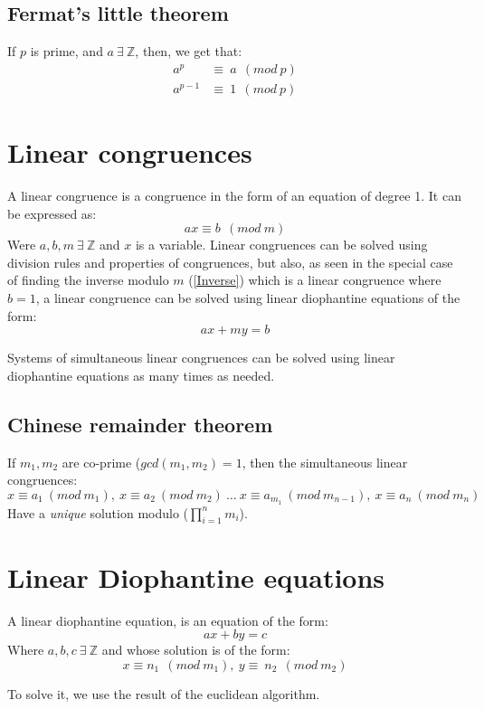 \documentclass[11pt,twoside]{article}
\theoremstyle{defi}
\begin{document}
\subsection{Fermat's little theorem}
If $p$ is prime, and $a\ \exists\ \mathbb{Z}$, then, we get that:
\begin{align}
a^p &\equiv\ a\ \ (mod\ p)\\
a^{p-1} &\equiv\ 1\ \ (mod\ p)
\end{align}

\section{Linear congruences}
\begin{definitionii}
A linear congruence is a congruence in the form of an equation of degree 1. It can be expressed as:
$$ ax \equiv b\ \ (mod\ m)$$
Were $a,b,m\ \exists\ \mathbb{Z}$ and $x$ is a variable. Linear congruences can be solved using division rules and properties of congruences, but also, as seen in the special case of finding the inverse modulo $m$ (\ref{Inverse}) which is a linear congruence where $b=1$, a linear congruence can be solved using linear diophantine equations of the form:
$$ax + my = b$$
\end{definitionii}
Systems of simultaneous linear congruences can be solved using linear diophantine equations as many times as needed.
\subsection{Chinese remainder theorem}
If $m_1,m_2$ are co-prime ($gcd(m_1,m_2)=1$, then the simultaneous linear congruences:
$$x \equiv a_1\ (mod\ m_1),\ x \equiv a_2\ (mod\ m_2)\ \ldots\ x \equiv a_{m_1}\ (mod\ m_{n-1}),\ x \equiv a_n\ (mod\ m_n)$$
Have a \emph{unique} solution modulo ($\prod_{i=1}^nm_i$).

\section{Linear Diophantine equations}
\begin{definitionii}
A linear diophantine equation, is an equation of the form:
$$ ax+ by = c$$ 
Where $a,b,c\ \exists\ \mathbb{Z}$ and whose solution is of the form:
$$ x \equiv n_1\ \ (mod\ m_1),\ y \equiv\ n_2\ \ (mod\ m_2)$$ 
\end{definitionii}
To solve it, we use the result of the euclidean algorithm.
\end{document}
